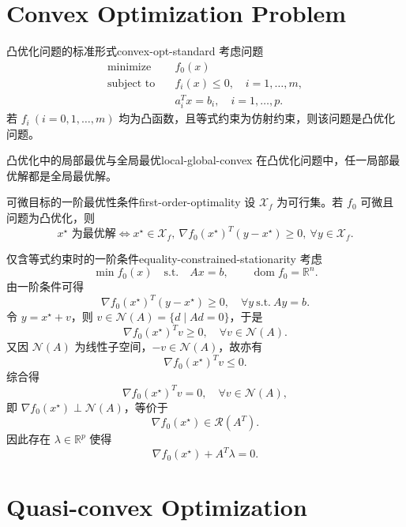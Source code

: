 \documentclass[11pt,a4paper]{article}
\begin{document}
\section{Convex Optimization Problem}\label{sec:ch4-convex-opt}

\begin{definition}{凸优化问题的标准形式}{convex-opt-standard}
考虑问题
\[
\begin{aligned}
\text{minimize}\quad & f_0(x)\\
\text{subject to}\quad & f_i(x)\le0,\quad i=1,\dots,m,\\
& a_i^Tx=b_i,\quad i=1,\dots,p.
\end{aligned}
\]
若 $f_i\ (i=0,1,\dots,m)$ 均为凸函数，且等式约束为仿射约束，则该问题是凸优化问题。
\end{definition}

\begin{theorem}{凸优化中的局部最优与全局最优}{local-global-convex}
在凸优化问题中，任一局部最优解都是全局最优解。
\end{theorem}

\begin{definition}{可微目标的一阶最优性条件}{first-order-optimality}
设 $\mathcal X_f$ 为可行集。若 $f_0$ 可微且问题为凸优化，则
\[
x^\star \text{ 为最优解}
\iff
x^\star\in\mathcal X_f,\ 
\nabla f_0(x^\star)^T(y-x^\star)\ge0,\ \forall y\in\mathcal X_f.
\]
\end{definition}

\begin{example}{仅含等式约束时的一阶条件}{equality-constrained-stationarity}
考虑
\[
\min f_0(x)\quad \text{s.t.}\quad Ax=b,\qquad \operatorname{dom}f_0=\mathbb R^n.
\]
由一阶条件可得
\[
\nabla f_0(x^\star)^T(y-x^\star)\ge0,\quad \forall y\ \text{s.t.}\ Ay=b.
\]
令 $y=x^\star+v$，则 $v\in\mathcal N(A)=\{d\mid Ad=0\}$，于是
\[
\nabla f_0(x^\star)^Tv\ge0,\quad \forall v\in\mathcal N(A).
\]
又因 $\mathcal N(A)$ 为线性子空间，$-v\in\mathcal N(A)$，故亦有
\[
\nabla f_0(x^\star)^Tv\le0.
\]
综合得
\[
\nabla f_0(x^\star)^Tv=0,\quad \forall v\in\mathcal N(A),
\]
即 $\nabla f_0(x^\star)\perp\mathcal N(A)$，等价于
\[
\nabla f_0(x^\star)\in\mathcal R(A^T).
\]
因此存在 $\lambda\in\mathbb R^p$ 使得
\[
\nabla f_0(x^\star)+A^T\lambda=0.
\]
\end{example}

\section{Quasi-convex Optimization}\label{sec:ch4-quasi-convex}
\end{document}
